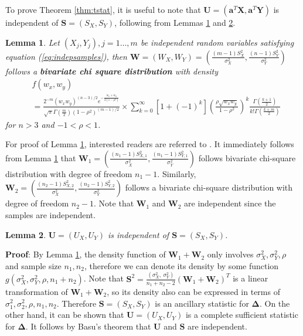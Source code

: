 \documentclass[12pt, a4paper]{article}
\newtheorem{lemma}{Lemma}
\begin{document}
	To prove Theorem \ref{thm:tstat}, it is useful to note that $\bm U = (\bm a^T\bm X, \bm a^T\bm 
	Y)$ is independent of $\bm S = (S_X, S_Y)$,
	following from Lemmas \ref{lemmabiChisq} and \ref{lemmaIndep}.
	\begin{lemma}\label{lemmabiChisq}
		Let $(X_{j}, Y_{j}), j=1 \ldots,  m$ be independent random variables satisfying equation 
		(\ref{eq:indepsamples}),
		then $\bm W = (W_{X},W_{Y}) =(\frac{(m -1)S_{X}^2}{\sigma_X^2}, 
		\frac{(n-1)S_{Y}^2}{\sigma_Y^2})$ 
		follows a \textbf{bivariate chi square distribution} with density 
		\begin{equation}\label{biChisq}
		\begin{aligned}
		&f(w_x, w_y) \\
		& = \frac{2^{-m}(w_xw_y)^{(n-3)/2}e^{-\frac{w_x +
					w_y}{2(1-\rho^2)}}}{\sqrt{\pi}\Gamma(\frac{m}{2})(1-\rho^2)^{(m-1)/2}} 
		\times  \sum_{k=0}^{\infty}[1 +
		(-1)^k]\left(\frac{\rho\sqrt{w_xw_y}}{1-\rho^2}\right)^k\frac{\Gamma(\frac{k+1}{2})}{k!\Gamma(\frac{k+
				m}{2})}
		\end{aligned}
		\end{equation}
		for $n>3$ and $-1<\rho < 1$.
	\end{lemma}
	For proof of Lemma \ref{lemmabiChisq}, interested readers are referred to 
	\citet{joarder2009moments}.
	It immediately follows from Lemma \ref{lemmabiChisq} that $\bm W_1 = (\frac{(n_1 -1)S_{X, 
			1}^2}{\sigma_X^2}, \frac{(n_1-1)S_{Y, 1}^2}{\sigma_Y^2})$ follows bivariate chi-square 
	distribution with degree of freedom $n_1-1$. Similarly, $\bm W_2 =(\frac{(n_2 -1)S_{X, 
			2}^2}{\sigma_X^2}, \frac{(n_2-1)S_{Y, 2}^2}{\sigma_Y^2})$ follows a bivariate 
			chi-square 
	distribution with degree of freedom $n_2-1$.  Note that $\bm W_1$ and $\bm W_2$ are independent 
	since the samples are independent. 
	
	\begin{lemma}\label{lemmaIndep}
		$\bm U =(U_X, U_Y)$ is independent of $\bm S = (S_X ,S_Y)$.
	\end{lemma}
	\textbf{Proof}: By Lemma \ref{lemmabiChisq}, the density function of $
	\bm W_1 + \bm W_2$ only involves $\sigma^2_X, \sigma^2_Y, \rho$ and sample size $n_1, n_2$, 
	therefore
	we can denote its density by some function $g(\sigma^2_X, \sigma^2_Y, \rho,
	n_1 + n_2)$. Note that $\bm S^2 = \frac{(\sigma_X^2, ~\sigma^2_Y)}{n_1 +n_2 -2}(\bm W_1 + \bm 
	W_2)^T $
	is a linear transformation of $\bm W_1 + \bm W_2$, so its density also can be expressed in 
	terms of $\sigma^2_1, \sigma^2_2, \rho, n_1, n_2$. Therefore $\bm S = (S_X ,S_Y)$ is an 
	ancillary statistic for $\bm \Delta$. On the other hand, it can
	be shown that $\bm U =(U_X, U_Y)$ is a complete sufficient statistic for $\bm \Delta$. It 
	follows by
	Basu's theorem that $\bm U$ and $\bm S$ are independent. 
	
\end{document}
